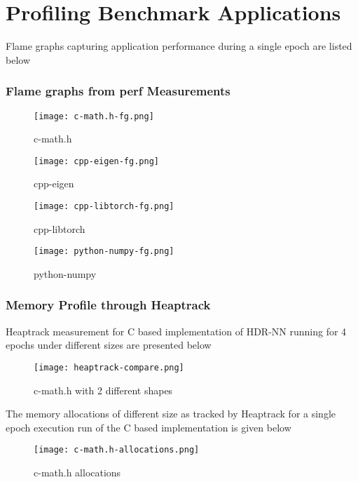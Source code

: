 \chapter{Profiling Benchmark Applications} \label{hdrnn-profile}

Flame graphs capturing application performance during a single epoch are listed below

\subsection*{Flame graphs from perf Measurements}

\begin{figure}[H]
	\centering
	\texttt{[image: c-math.h-fg.png]}
	\caption{c-math.h}
\end{figure}

\begin{figure}[H]
	\centering
	\texttt{[image: cpp-eigen-fg.png]}
	\caption{cpp-eigen}
\end{figure}

\begin{figure}[H]
	\centering
	\texttt{[image: cpp-libtorch-fg.png]}
	\caption{cpp-libtorch}
\end{figure}

\begin{figure}[H]
	\centering
	\texttt{[image: python-numpy-fg.png]}
	\caption{python-numpy}
\end{figure}

\subsection*{Memory Profile through Heaptrack} \label{hdrnn-memory-profile}

Heaptrack measurement for C based implementation of HDR-NN running for 4 epochs under different sizes are presented below

\begin{figure}[ht]
	\centering
	\texttt{[image: heaptrack-compare.png]}
	\caption{c-math.h with 2 different shapes}
\end{figure}

The memory allocations of different size as tracked by Heaptrack for a single epoch execution run of the C based implementation is given below

\begin{figure}[ht]
	\centering
	\texttt{[image: c-math.h-allocations.png]}
	\caption{c-math.h allocations}
\end{figure}
